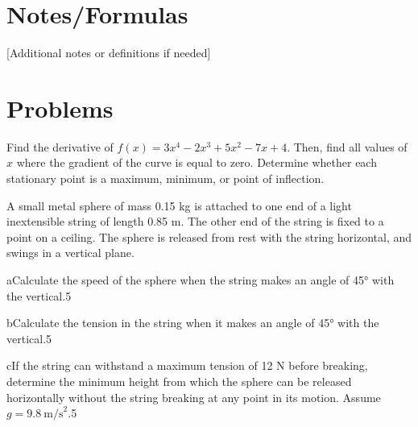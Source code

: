 
\hrulefill

\section*{Notes/Formulas}

[Additional notes or definitions if needed]

\hrulefill

\section*{Problems}



\begin{problem}{10}
Find the derivative of $f(x) = 3x^4 - 2x^3 + 5x^2 - 7x + 4$. Then, find all values of $x$ where the gradient of the curve is equal to zero. Determine whether each stationary point is a maximum, minimum, or point of inflection.

\begin{solution}

\end{solution}
\end{problem}

\begin{problem}{15}
A small metal sphere of mass 0.15 kg is attached to one end of a light inextensible string of length 0.85 m. The other end of the string is fixed to a point on a ceiling. The sphere is released from rest with the string horizontal, and swings in a vertical plane.

\begin{part}{a}{Calculate the speed of the sphere when the string makes an angle of 45° with the vertical.}{5}
\begin{solution}

\end{solution}
\end{part}

\begin{part}{b}{Calculate the tension in the string when it makes an angle of 45° with the vertical.}{5}
\begin{solution}

\end{solution}
\end{part}

\begin{part}{c}{If the string can withstand a maximum tension of 12 N before breaking, determine the minimum height from which the sphere can be released horizontally without the string breaking at any point in its motion. Assume $g = 9.8~\text{m/s}^2$.}{5}
\begin{solution}

\end{solution}
\end{part}

\end{problem} 
